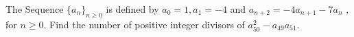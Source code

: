 The Sequence $\{a_{n}\}_{n \geqslant 0}$  is defined by $a_{0}=1, a_{1}=-4$ and $a_{n+2}=-4a_{n+1}-7a_{n}$ , for $n \geqslant 0$. Find the number of positive integer divisors of $a^2_{50}-a_{49}a_{51}$.
